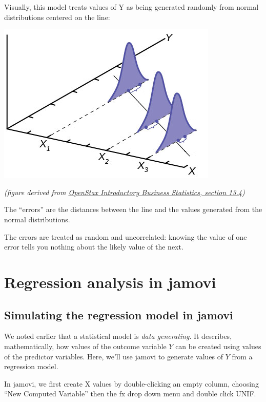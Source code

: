 \documentclass[
  letterpaper,
  DIV=11,
  numbers=noendperiod]{scrreprt}
\begin{document}
Visually, this model treats values of Y as being generated randomly from
normal distributions centered on the line:

\includegraphics{images/mod2_pt1 (6).png}

\emph{(figure derived from
\href{https://openstax.org/books/introductory-business-statistics/pages/13-4-the-regression-equation}{OpenStax
Introductory Business Statistics, section 13.4})}

The ``errors'' are the distances between the line and the values
generated from the normal distributions.

The errors are treated as random and uncorrelated: knowing the value of
one error tells you nothing about the likely value of the next.

\hypertarget{regression-analysis-in-jamovi}{%
\section{Regression analysis in
jamovi}\label{regression-analysis-in-jamovi}}

\hypertarget{simulating-the-regression-model-in-jamovi}{%
\subsection{Simulating the regression model in
jamovi}\label{simulating-the-regression-model-in-jamovi}}

We noted earlier that a statistical model is \emph{data generating}. It
describes, mathematically, how values of the outcome variable \(Y\) can
be created using values of the predictor variables. Here, we'll use
jamovi to generate values of \(Y\) from a regression model.

In jamovi, we first create X values by double-clicking an empty column,
choosing ``New Computed Variable'' then the fx drop down menu and double
click UNIF.
\end{document}
